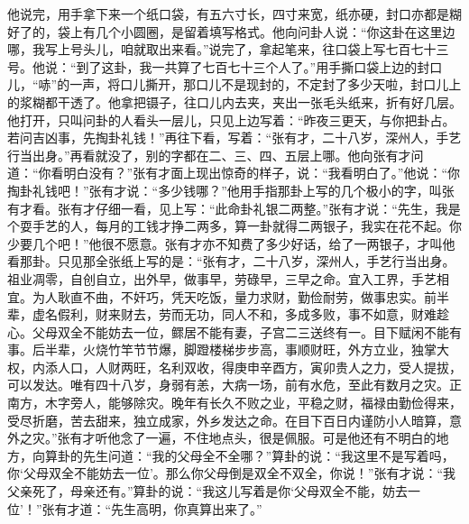 \documentclass[12pt,UTF8]{ctexbook}
\begin{document}
他说完，用手拿下来一个纸口袋，有五六寸长，四寸来宽，纸亦硬，封口亦都是糊好了的，袋上有几个小圆圈，是留着填写格式。他向问卦人说：“你这卦在这里边哪，我写上号头儿，咱就取出来看。”说完了，拿起笔来，往口袋上写七百七十三号。他说：“到了这卦，我一共算了七百七十三个人了。”用手撕口袋上边的封口儿，“哧”的一声，将口儿撕开，那口儿不是现封的，不定封了多少天啦，封口儿上的浆糊都干透了。他拿把镊子，往口儿内去夹，夹出一张毛头纸来，折有好几层。他打开，只叫问卦的人看头一层儿，只见上边写着：“昨夜三更天，与你把卦占。若问吉凶事，先掏卦礼钱！”再往下看，写着：“张有才，二十八岁，深州人，手艺行当出身。”再看就没了，别的字都在二、三、四、五层上哪。他向张有才问道：“你看明白没有？”张有才面上现出惊奇的样子，说：“我看明白了。”他说：“你掏卦礼钱吧！”张有才说：“多少钱哪？”他用手指那卦上写的几个极小的字，叫张有才看。张有才仔细一看，见上写：“此命卦礼银二两整。”张有才说：“先生，我是个耍手艺的人，每月的工钱才挣二两多，算一卦就得二两银子，我实在花不起。你少要几个吧！”他很不愿意。张有才亦不知费了多少好话，给了一两银子，才叫他看那卦。只见那全张纸上写的是：“张有才，二十八岁，深州人，手艺行当出身。祖业凋零，自创自立，出外早，做事早，劳碌早，三早之命。宜入工界，手艺相宜。为人耿直不曲，不奸巧，凭天吃饭，量力求财，勤俭耐劳，做事忠实。前半辈，虚名假利，财来财去，劳而无功，同人不和，多成多败，事不如意，财难趁心。父母双全不能妨去一位，鳏居不能有妻，子宫二三送终有一。目下赋闲不能有事。后半辈，火烧竹竿节节爆，脚蹬楼梯步步高，事顺财旺，外方立业，独掌大权，内添人口，人财两旺，名利双收，得庚申辛酉方，寅卯贵人之力，受人提拔，可以发达。唯有四十八岁，身弱有恙，大病一场，前有水危，至此有数月之灾。正南方，木字旁人，能够除灾。晚年有长久不败之业，平稳之财，福禄由勤俭得来，受尽折磨，苦去甜来，独立成家，外乡发达之命。在目下百日内谨防小人暗算，意外之灾。”张有才听他念了一遍，不住地点头，很是佩服。可是他还有不明白的地方，向算卦的先生问道：“我的父母全不全哪？”算卦的说：“我这里不是写着吗，你‘父母双全不能妨去一位’。那么你父母倒是双全不双全，你说！”张有才说：“我父亲死了，母亲还有。”算卦的说：“我这儿写着是你‘父母双全不能，妨去一位’！”张有才道：“先生高明，你真算出来了。”
\end{document}
